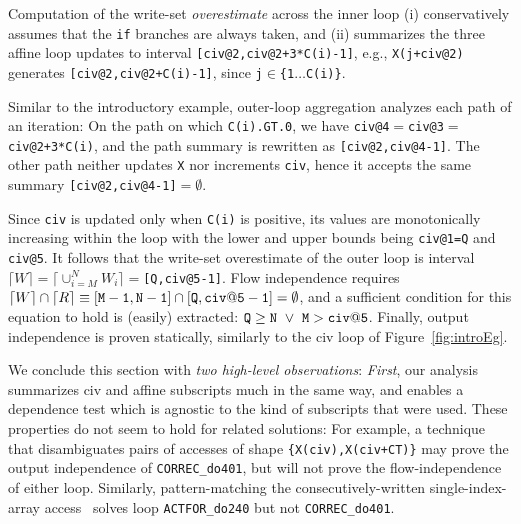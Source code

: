 \documentclass{sig-alternate}
\begin{document}
Computation of the write-set {\em overestimate} across the inner loop 
(i)  conservatively assumes that the {\tt if} branches are always taken, and
(ii) summarizes the three affine loop updates 
to interval {\tt[civ@2,civ@2+3*C(i)-1]},
e.g., {\tt X(j+civ@2)} generates {\tt[civ@2,civ@2+C(i)-1]}, since  
{\tt j$\in$\{1$\ldots$C(i)\}}.

Similar to the introductory example, outer-loop aggregation
analyzes each path of an iteration:
On the path on which {\tt C(i).GT.0}, we have %
{\tt civ@4$=$civ@3$=$civ@2+3*C(i)}, and the path summary is
rewritten as {\tt [civ@2,civ@4-1]}. The other path neither 
updates {\tt X} nor increments {\tt civ}, hence it accepts the
same summary {\tt[civ@2,civ@4-1]$=\emptyset$}.

Since {\tt civ} is updated only when {\tt C(i)} is positive,
its values are monotonically increasing within the loop with
the lower and upper bounds being {\tt civ@1=Q} and {\tt civ@5}. 
It follows that the write-set overestimate of the outer loop is 
interval $\lceil W \rceil = \lceil \cup_{i=M}^{N}W_i\rceil =${\tt[Q,civ@5-1]}.
Flow independence requires   
$\lceil W\rceil\cap\lceil R \rceil \equiv {\tt [M-1,N-1]}\cap{\tt{}[Q,civ@5-1]}=\emptyset$,
and a sufficient condition for this equation to hold is (easily) extracted:
${\tt Q} \ge {\tt N}~\vee~{\tt M} > {\tt{}civ@5}$.
%
Finally, output independence is proven statically, similarly to the 
{\sc civ} loop of Figure~\ref{fig:introEg}.

\vspace{1ex}
We conclude this section with {\em two high-level observations}: %
{\em First}, our analysis summarizes {\sc civ} and affine subscripts
much in the same way, and enables a dependence test which is agnostic
to the kind of subscripts that were used.
%
% 
%
These properties do not seem to hold for related solutions: For example, 
a technique~\cite{CohenBeyondMon} that disambiguates pairs of accesses 
of shape {\tt \{X(civ),X(civ+CT)\}} may prove the output 
independence of {\tt CORREC\_do401}, but will not prove the flow-independence 
of either loop.
Similarly, pattern-matching the consecutively-written single-index-array
access~\cite{PaduaStackArr,VEG} solves loop  {\tt ACTFOR\_do240} but not
{\tt CORREC\_do401}.
\end{document}

